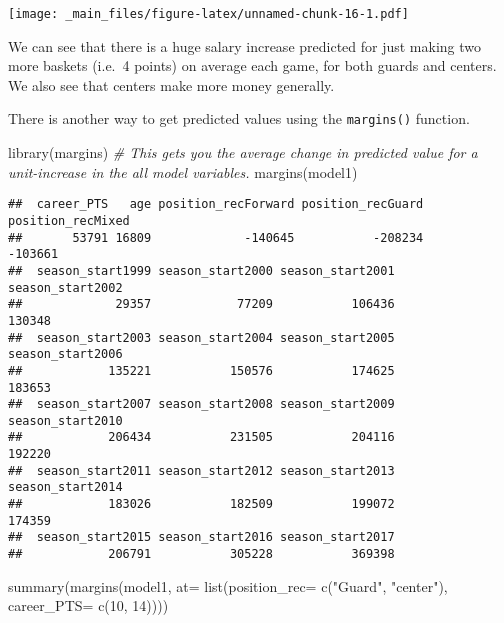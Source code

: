 \documentclass[
]{book}
\newenvironment{Shaded}{\begin{snugshade}}{\end{snugshade}}
\newcommand{\AttributeTok}[1]{\textcolor[rgb]{0.77,0.63,0.00}{#1}}
\newcommand{\AttributeTok}[1]{\textcolor[rgb]{0.13,0.29,0.53}{#1}}
\newcommand{\CommentTok}[1]{\textcolor[rgb]{0.56,0.35,0.01}{\textit{#1}}}
\newcommand{\DecValTok}[1]{\textcolor[rgb]{0.00,0.00,0.81}{#1}}
\newcommand{\FunctionTok}[1]{\textcolor[rgb]{0.00,0.00,0.00}{#1}}
\newcommand{\FunctionTok}[1]{\textcolor[rgb]{0.13,0.29,0.53}{\textbf{#1}}}
\newcommand{\NormalTok}[1]{#1}
\newcommand{\StringTok}[1]{\textcolor[rgb]{0.31,0.60,0.02}{#1}}
\begin{document}
\texttt{[image: \_main\_files/figure-latex/unnamed-chunk-16-1.pdf]}

We can see that there is a huge salary increase predicted for just making two more baskets (i.e.~4 points) on average each game, for both guards and centers. We also see that centers make more money generally.

There is another way to get predicted values using the \texttt{margins()} function.

\begin{Shaded}
\begin{Highlighting}[]
\FunctionTok{library}\NormalTok{(margins)}
\CommentTok{\# This gets you the average change in predicted value for a unit{-}increase in the all model variables.}
\FunctionTok{margins}\NormalTok{(model1)}
\end{Highlighting}
\end{Shaded}

\begin{verbatim}
##  career_PTS   age position_recForward position_recGuard position_recMixed
##       53791 16809             -140645           -208234           -103661
##  season_start1999 season_start2000 season_start2001 season_start2002
##             29357            77209           106436           130348
##  season_start2003 season_start2004 season_start2005 season_start2006
##            135221           150576           174625           183653
##  season_start2007 season_start2008 season_start2009 season_start2010
##            206434           231505           204116           192220
##  season_start2011 season_start2012 season_start2013 season_start2014
##            183026           182509           199072           174359
##  season_start2015 season_start2016 season_start2017
##            206791           305228           369398
\end{verbatim}

\begin{Shaded}
\begin{Highlighting}[]
\FunctionTok{summary}\NormalTok{(}\FunctionTok{margins}\NormalTok{(model1, }\AttributeTok{at=} \FunctionTok{list}\NormalTok{(}\AttributeTok{position\_rec=} \FunctionTok{c}\NormalTok{(}\StringTok{"Guard"}\NormalTok{, }\StringTok{"center"}\NormalTok{),}
                         \AttributeTok{career\_PTS=} \FunctionTok{c}\NormalTok{(}\DecValTok{10}\NormalTok{, }\DecValTok{14}\NormalTok{))))}
\end{Highlighting}
\end{Shaded}
\end{document}
